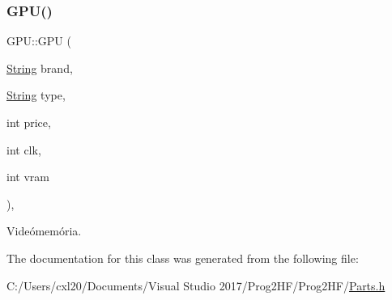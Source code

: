 \subsubsection{\texorpdfstring{GPU()}{GPU()}}
{\footnotesize\ttfamily G\+P\+U\+::\+G\+PU (\begin{DoxyParamCaption}\item[{\mbox{\hyperlink{class_string}{String}}}]{brand,  }\item[{\mbox{\hyperlink{class_string}{String}}}]{type,  }\item[{int}]{price,  }\item[{int}]{clk,  }\item[{int}]{vram }\end{DoxyParamCaption})\hspace{0.3cm}{\ttfamily [inline]}, {\ttfamily [explicit]}}



Videómemória. 



The documentation for this class was generated from the following file\+:\begin{DoxyCompactItemize}
\item 
C\+:/\+Users/cxl20/\+Documents/\+Visual Studio 2017/\+Prog2\+H\+F/\+Prog2\+H\+F/\mbox{\hyperlink{_parts_8h}{Parts.\+h}}\end{DoxyCompactItemize}

